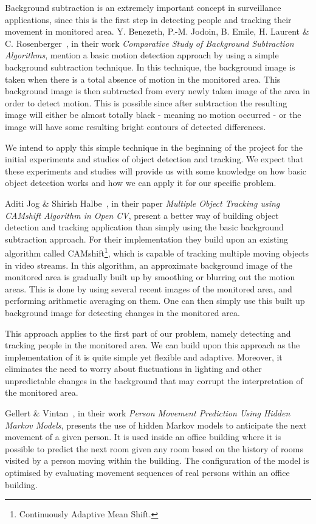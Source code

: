 Background subtraction is an extremely important concept in surveillance applications, since this is the first step in detecting people and tracking their movement in monitored area. Y. Benezeth, P.-M. Jodoin, B. Emile, H. Laurent \& C. Rosenberger~\cite{simple_background_subtraction}, in their work \emph{Comparative Study of Background Subtraction Algorithms}, mention a basic motion detection approach by using a simple background subtraction technique. In this technique, the background image is taken when there is a total absence of motion in the monitored area. This background image is then subtracted from every newly taken image of the area in order to detect motion. This is possible since after subtraction the resulting image will either be almost totally black - meaning no motion occurred - or the image will have some resulting bright contours of detected differences.

We intend to apply this simple technique in the beginning of the project for the initial experiments and studies of object detection and tracking. We expect that these experiments and studies will provide us with some knowledge on how basic object detection works and how we can apply it for our specific problem.

Aditi Jog \& Shirish Halbe~\cite{jog_halbe}, in their paper \emph{Multiple Object Tracking using CAMshift Algorithm in Open CV}, present a better way of building object detection and tracking application than simply using the basic background subtraction approach. For their implementation they build upon an existing algorithm called CAMshift\footnote{Continuously Adaptive Mean Shift.}, which is capable of tracking multiple moving objects in video streams. In this algorithm, an approximate background image of the monitored area is gradually built up by smoothing or blurring out the motion areas. This is done by using several recent images of the monitored area, and performing arithmetic averaging on them. One can then simply use this built up background image for detecting changes in the monitored area.

This approach applies to the first part of our problem, namely detecting and tracking people in the monitored area. We can build upon this approach as the implementation of it is quite simple yet flexible and adaptive. Moreover, it eliminates the need to worry about fluctuations in lighting and other unpredictable changes in the background that may corrupt the interpretation of the monitored area.

Gellert \& Vintan~\cite{gellert}, in their work \emph{Person Movement Prediction Using Hidden Markov Models}, presents the use of hidden Markov models to anticipate the next movement of a given person. It is used inside an office building where it is possible to predict the next room given any room based on the history of rooms visited by a person moving within the building. The configuration of the model is optimised by evaluating movement sequences of real persons within an office building.

